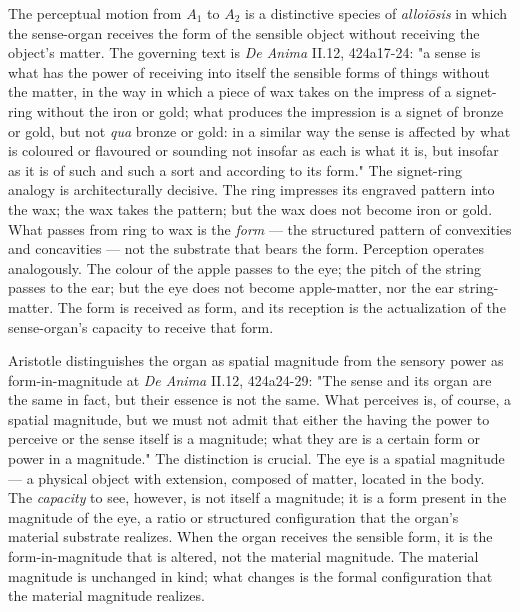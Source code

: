 \documentclass[12pt]{article}
\begin{document}
The perceptual motion from $A_1$ to $A_2$ is a distinctive species of \textit{alloiōsis} in which the sense-organ receives the form of the sensible object without receiving the object's matter. The governing text is \textit{De Anima} II.12, 424a17-24: "a sense is what has the power of receiving into itself the sensible forms of things without the matter, in the way in which a piece of wax takes on the impress of a signet-ring without the iron or gold; what produces the impression is a signet of bronze or gold, but not \textit{qua} bronze or gold: in a similar way the sense is affected by what is coloured or flavoured or sounding not insofar as each is what it is, but insofar as it is of such and such a sort and according to its form." The signet-ring analogy is architecturally decisive. The ring impresses its engraved pattern into the wax; the wax takes the pattern; but the wax does not become iron or gold. What passes from ring to wax is the \textit{form} --- the structured pattern of convexities and concavities --- not the substrate that bears the form. Perception operates analogously. The colour of the apple passes to the eye; the pitch of the string passes to the ear; but the eye does not become apple-matter, nor the ear string-matter. The form is received as form, and its reception is the actualization of the sense-organ's capacity to receive that form.

Aristotle distinguishes the organ as spatial magnitude from the sensory power as form-in-magnitude at \textit{De Anima} II.12, 424a24-29: "The sense and its organ are the same in fact, but their essence is not the same. What perceives is, of course, a spatial magnitude, but we must not admit that either the having the power to perceive or the sense itself is a magnitude; what they are is a certain form or power in a magnitude." The distinction is crucial. The eye is a spatial magnitude --- a physical object with extension, composed of matter, located in the body. The \textit{capacity} to see, however, is not itself a magnitude; it is a form present in the magnitude of the eye, a ratio or structured configuration that the organ's material substrate realizes. When the organ receives the sensible form, it is the form-in-magnitude that is altered, not the material magnitude. The material magnitude is unchanged in kind; what changes is the formal configuration that the material magnitude realizes.
\end{document}
